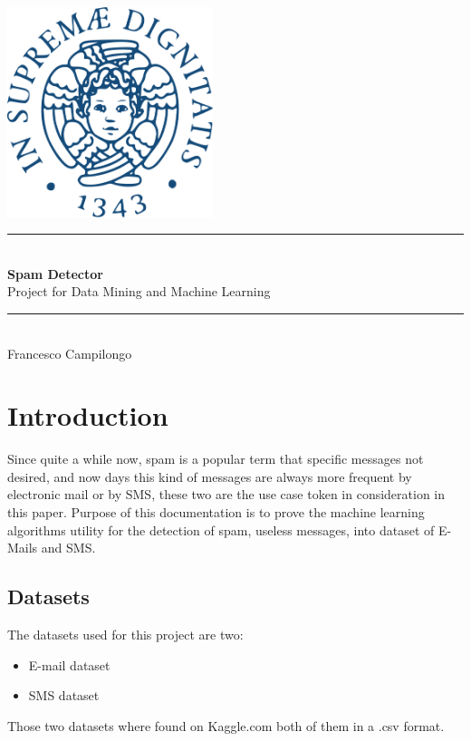 \documentclass[a4paper]{report}
\newcommand{\HRule}{\rule{\linewidth}{0.5mm}}
\begin{document}
	\begin{titlepage}
		\begin{center}
			
			\includegraphics[width=0.45\textwidth]{img/unipi.png}~\\[2.5cm]
			
			
			\HRule \\[0.4cm]
			{ \LARGE 
				\textbf{Spam Detector}\\[0.4cm]
				{Project for Data Mining and Machine Learning}\\[0.4cm]
			}
			\HRule \\[1.5cm]
			
			
			
			{ \large
				Francesco Campilongo \\[0.1cm]
			}
			
			\vfill
			
		\end{center}
	\end{titlepage}

\tableofcontents
\chapter{Introduction}
Since quite a while now, spam is a popular term that specific messages not desired, and now days this kind of messages are always more frequent by electronic mail or by SMS, these two are the use case token in consideration in this paper.
Purpose of this documentation is to prove the machine learning algorithms utility for the detection of spam, useless messages, into dataset of E-Mails and SMS.

\section{Datasets}
The datasets used for this project are two:
\begin{itemize}
	\item E-mail dataset
	\item SMS dataset
\end{itemize}
Those two datasets where found on Kaggle.com both of them in a .csv format.
\end{document}

